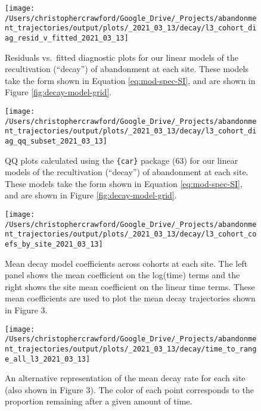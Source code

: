 \documentclass[9pt,twocolumn,twoside,lineno]{pnas-new}
\begin{document}
\begin{figure}
\texttt{[image: /Users/christophercrawford/Google\_Drive/\_Projects/abandonment\_trajectories/output/plots/\_2021\_03\_13/decay/l3\_cohort\_diag\_resid\_v\_fitted\_2021\_03\_13]} \caption{Residuals vs.~fitted diagnostic plots for our linear models of the recultivation (``decay'') of abandonment at each site. These models take the form shown in Equation \eqref{eq:mod-spec-SI}, and are shown in Figure \ref{fig:decay-model-grid}.}\label{fig:diag-resid-fitted}
\end{figure}



\begin{figure}
\texttt{[image: /Users/christophercrawford/Google\_Drive/\_Projects/abandonment\_trajectories/output/plots/\_2021\_03\_13/decay/l3\_cohort\_diag\_qq\_subset\_2021\_03\_13]} \caption{QQ plots calculated using the \texttt{\{car\}} package (63) for our linear models of the recultivation (``decay'') of abandonment at each site. These models take the form shown in Equation \eqref{eq:mod-spec-SI}, and are shown in Figure \ref{fig:decay-model-grid}.}\label{fig:diag-qq}
\end{figure}



\begin{figure}
\texttt{[image: /Users/christophercrawford/Google\_Drive/\_Projects/abandonment\_trajectories/output/plots/\_2021\_03\_13/decay/l3\_cohort\_coefs\_by\_site\_2021\_03\_13]} \caption{Mean decay model coefficients across cohorts at each site. The left panel shows the mean coefficient on the log(time) terms and the right shows the site mean coefficient on the linear time terms. These mean coefficients are used to plot the mean decay trajectories shown in Figure 3.}\label{fig:decay-mod-coef}
\end{figure}



\begin{figure}
\texttt{[image: /Users/christophercrawford/Google\_Drive/\_Projects/abandonment\_trajectories/output/plots/\_2021\_03\_13/decay/time\_to\_range\_all\_l3\_2021\_03\_13]} \caption{An alternative representation of the mean decay rate for each site (also shown in Figure 3). The color of each point corresponds to the proportion remaining after a given amount of time.}\label{fig:decay-time-to-range}
\end{figure}
\end{document}
